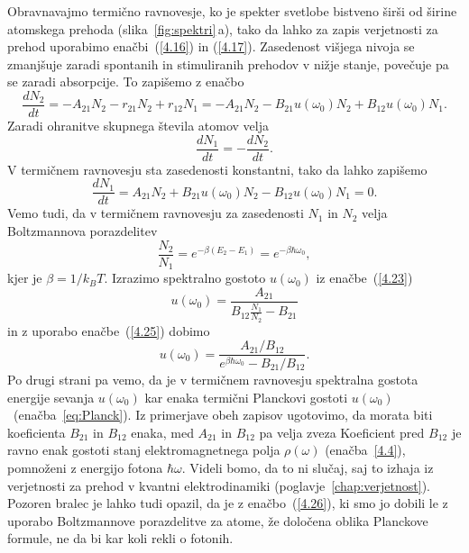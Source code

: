 Obravnavajmo termično ravnovesje, ko je spekter svetlobe bistveno širši
od širine atomskega prehoda (slika~\ref{fig:spektri}\,a), tako da lahko za zapis
verjetnosti za prehod uporabimo enačbi~(\ref{4.16}) in (\ref{4.17}). Zasedenost višjega nivoja
se zmanjšuje zaradi spontanih in stimuliranih prehodov v nižje
stanje, povečuje pa se zaradi absorpcije. To zapišemo z enačbo
\begin{equation}
\frac{dN_{2}}{dt}=-A_{21}N_2 - r_{21}N_2 + r_{12}N_1 = 
-A_{21}N_{2}-B_{21}u(\omega_{0})N_{2}+B_{12}u(\omega_{0})N_{1}.
\label{4.22}
\end{equation}
Zaradi ohranitve skupnega števila atomov velja 
\begin{equation}
\frac{dN_{1}}{dt}=-\frac{dN_{2}}{dt}.
\end{equation}
V termičnem ravnovesju sta zasedenosti konstantni, tako da lahko zapišemo 
\begin{equation}
\frac{dN_{1}}{dt}=A_{21}N_{2}+B_{21}u(\omega_{0})N_{2}-B_{12}u(\omega_{0})N_{1}=0.
\label{4.23}
\end{equation}
Vemo tudi, da v termičnem ravnovesju za zasedenosti $N_{1}$ in $N_{2}$ velja
Boltzmannova porazdelitev
\begin{equation}
\frac{N_{2}}{N_{1}}=e^{-\beta(E_{2}-E_{1})} = e^{-\beta \hbar \omega_0},
\label{4.25}
\end{equation}
kjer je $\beta=1/k_BT$. Izrazimo spektralno gostoto $u(\omega_0)$ 
iz enačbe~(\ref{4.23})
\begin{equation}
u(\omega_{0})=\frac{A_{21}}{B_{12}\frac{N_{1}}{N_{2}}-B_{21}}
\label{4.24}
\end{equation}
in z uporabo enačbe~(\ref{4.25}) dobimo
\begin{equation}
u(\omega_{0})=\frac{A_{21}/B_{12}}{e^{\beta\hbar\omega_{0}}-B_{21}/B_{12}}.
\label{4.26}
\end{equation}
Po drugi strani pa vemo, da je v termičnem ravnovesju spektralna gostota energije sevanja
$u(\omega_0)$ kar enaka termični Planckovi gostoti $u(\omega_{0})$~(enačba~\ref{eq:Planck}).
Iz primerjave obeh zapisov ugotovimo, da morata biti koeficienta $B_{21}$ in $B_{12}$ enaka,
med $A_{21}$ in $B_{12}$ pa velja zveza 
Koeficient pred $B_{12}$ je ravno enak gostoti stanj elektromagnetnega polja 
$\rho(\omega)$ (enačba~\ref{4.4}), pomnoženi z energijo fotona $\hbar\omega$. 
Videli bomo, da to ni slučaj, saj to izhaja iz verjetnosti za prehod v kvantni 
elektrodinamiki (poglavje~\ref{chap:verjetnost}).
Pozoren bralec je lahko tudi opazil, da je z enačbo~(\ref{4.26}),
ki smo jo dobili le z uporabo Boltzmannove porazdelitve za atome, že
določena oblika Planckove formule, ne da bi kar koli rekli o fotonih.

